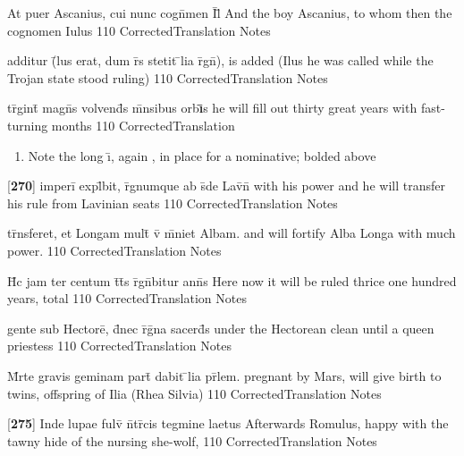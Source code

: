 \documentclass[]{book}
\begin{document}
\latline
  {At puer Ascanius, cui nunc cogn\={}men I\={}l\={}}
  { And the boy Ascanius, to whom then the cognomen Iulus  }
  {110}
  { CorrectedTranslation }
  { Notes }


\latline
  {additur (\={}lus erat, dum r\={}s stetit \={}lia r\={}gn\={}),}
  { is added (Ilus he was called while the Trojan state stood ruling) }
  {110}
  { CorrectedTranslation }
  { Notes }


\latline
  {tr\={\macron {\i}}gint\={} magn\={}s volvend\={\macron {\i}}s m\={}nsibus orb\textbf{\={\i}}s}
  { he will fill out thirty great years with fast-turning months  }
  {110}
  { CorrectedTranslation }
  { \begin{enumerate}
  	\item Note the long \={\i}, again , in place for a nominative; bolded above
  \end{enumerate} }


\latline
  {[\textbf{270}] imperi\={} expl\={}bit, r\={}gnumque ab s\={}de Lav\={\macron {\i}}n\={\macron {\i}}}
  { with his power and he will transfer his rule from Lavinian seats }
  {110}
  { CorrectedTranslation }
  { Notes }


\latline
  {tr\={}nsferet, et Longam mult\={} v\={\macron {\i}} m\={}niet Albam.}
  { and will fortify Alba Longa with much power. }
  {110}
  { CorrectedTranslation }
  { Notes }


\latline
  {H\={\macron {\i}}c jam ter centum t\={}t\={}s r\={}gn\={}bitur ann\={}s }
  { Here now it will be ruled thrice one hundred years, total }
  {110}
  { CorrectedTranslation }
  { Notes }


\latline
  {gente sub Hectore\={}, d\={}nec r\={}g\={\macron {\i}}na sacerd\={}s}
  { under the Hectorean clean until a queen priestess }
  {110}
  { CorrectedTranslation }
  { Notes }


\latline
  {M\={}rte gravis geminam part\={} dabit \={}lia pr\={}lem.}
  { pregnant by Mars, will give birth to twins, offspring of Ilia (Rhea Silvia) }
  {110}
  { CorrectedTranslation }
  { Notes }


\latline
  {[\textbf{275}] Inde lupae fulv\={} n\={}tr\={\macron {\i}}cis tegmine laetus}
  { Afterwards Romulus, happy with the tawny hide of the nursing she-wolf,  }
  {110}
  { CorrectedTranslation }
  { Notes }
\end{document}
